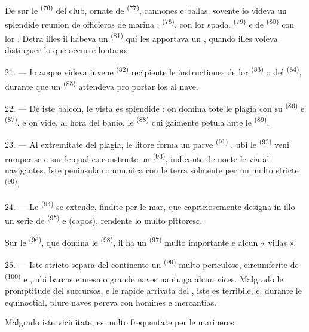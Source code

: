 De sur le  \textsuperscript{(76)} del club, ornate de
 \textsuperscript{(77)}, cannones e ballas, sovente io videva un
splendide reunion de officieros de marina : 
\textsuperscript{(78)}, con lor spada, 
\textsuperscript{(79)} e de  \textsuperscript{(80)} con lor
. Detra illes il habeva un 
\textsuperscript{(81)} qui les apportava un , quando illes
voleva distinguer lo que occurre lontano.

21. --- Io anque videva juvene  \textsuperscript{(82)}
recipiente le instructiones de lor  \textsuperscript{(83)} o
del  \textsuperscript{(84)}, durante que un 
\textsuperscript{(85)} attendeva pro portar los al nave.

22. --- De iste balcon, le vista es splendide : on domina tote le plagia con su
 \textsuperscript{(86)} e  \textsuperscript{(87)},
e on vide, al hora del banio, le  \textsuperscript{(88)} qui
gaimente petula ante le  \textsuperscript{(89)}.

23. --- Al extremitate del plagia, le litore forma un parve 
\textsuperscript{(91)} , ubi le 
\textsuperscript{(92)} veni rumper se e sur le qual es construite un 
\textsuperscript{(93)}, indicante de nocte le via al navigantes. Iste peninsula
communica con le terra solmente per un  multo stricte
\textsuperscript{(90)}.

\VUsaut{3.0mm}
\VUsaut{3.0mm}

24. --- Le  \textsuperscript{(94)} se extende, findite per le
mar, que capriciosemente designa in illo un serie de 
\textsuperscript{(95)} e  (capos), rendente lo multo
pittoresc.

Sur le  \textsuperscript{(96)}, que domina le
 \textsuperscript{(98)}, il ha un 
\textsuperscript{(97)} multo importante e alcun « villas ».

25. --- Iste stricto separa del continente un 
\textsuperscript{(99)} multo periculose, circumferite de 
\textsuperscript{(100)} e , ubi barcas e mesmo grande naves
naufraga alcun vices. Malgrado le promptitude del succursos, e le rapide arrivata
del , iste  es terribile, e,
durante le  equinoctial, plure naves pereva con homines e
mercantias.

Malgrado iste vicinitate,  es multo frequentate per le
marineros.
\VUsaut{6.0mm}
\VUfilet{22mm}
